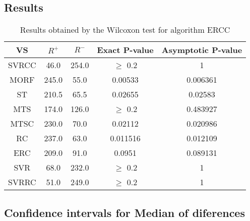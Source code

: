 \documentclass[a4paper,10pt]{article}
\begin{document}
\subsection{Results}

\begin{table}[!htp]
\centering\small
\begin{tabular}{
|c|c|c|c|c|}
\hline
 VS & $R^{+}$ & $R^{-}$ & Exact P-value & Asymptotic P-value \\ \hline 
SVRCC & 46.0 & 254.0 & $\geq$ 0.2 & 1\\ \hline 
MORF & 245.0 & 55.0 & 0.00533 & 0.006361\\ \hline 
ST & 210.5 & 65.5 & 0.02655 & 0.02583\\ \hline 
MTS & 174.0 & 126.0 & $\geq$ 0.2 & 0.483927\\ \hline 
MTSC & 230.0 & 70.0 & 0.02112 & 0.020986\\ \hline 
RC & 237.0 & 63.0 & 0.011516 & 0.012109\\ \hline 
ERC & 209.0 & 91.0 & 0.0951 & 0.089131\\ \hline 
SVR & 68.0 & 232.0 & $\geq$ 0.2 & 1\\ \hline 
SVRRC & 51.0 & 249.0 & $\geq$ 0.2 & 1\\ \hline 

\end{tabular}
\caption{Results obtained by the Wilcoxon test for algorithm ERCC}
\end{table}

\subsection{Confidence intervals for Median of diferences}
\end{document}
